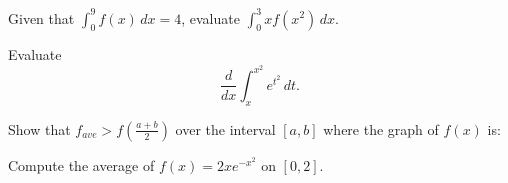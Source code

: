 \documentclass[addpoints,11pt]{exam}
\begin{document}
\begin{questions}

\newpage 

\question[5]
Given that $\int_0^9 f(x) \, dx = 4$, evaluate $\int_0^3 xf(x^2) \, dx$. 
\vfill 

\question[5] 
Evaluate 
\[
\frac{d}{dx} \int_x^{x^2} e^{t^2} \, dt .
\]
\vfill 


\question[5]
Show that $f_{ave} > f(\frac{a+b}{2})$ over the interval $[a,b]$ where the graph of $f(x)$ is: 
\vfill 
\vfill

\newpage 

\question[5]
Compute the average of $f(x) = 2xe^{-x^2}$ on $[0,2]$. 
\vfill 

\question 
{} 

\end{questions} 
\end{document}

